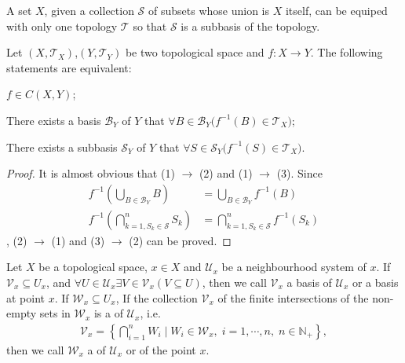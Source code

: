 \documentclass[openany]{book}
\begin{document}
A set $X$, given a collection $\mathscr S$ of subsets whose union is $X$ itself, can be equiped with only one topology $\mathscr T$ so that $\mathscr S$ is a subbasis of the topology. 

\begin{theorem}\label{continuity_basis}
Let $(X,\mathscr T_X)$,$(Y,\mathscr T_Y)$ be two topological space and $f \colon X\to Y$.
The following statements are equivalent:
\begin{conditionlist}[label=(\arabic*)]
\item $f \in C(X, Y)$;
\item There exists a basis $\mathscr B_Y$ of $Y$ that $\forall B\in \mathscr B_Y\big(
	f^{-1}(B) \in \mathscr T_X\big)$;
\item There exists a subbasis $\mathscr S_Y$ of $Y$ that $\forall S\in \mathscr S_Y\big(
	f^{-1}(S) \in \mathscr T_X\big)$.
\end{conditionlist}
\end{theorem}
\begin{proof}
It is almost obvious that (1) $\to$ (2) and (1) $\to$ (3). Since
\begin{align*}
	f^{-1} \left(
		\bigcup_{B\in \mathscr B_Y} B\right) &= \bigcup_{B\in \mathscr B_Y}  f^{-1}(B)\\
	f^{-1}\left(
		\bigcap^n_{k=1,S_k\in \mathscr S} S_k\right) &=\bigcap^n_{k=1,S_k\in \mathscr S} f^{-1}(S_k)
\end{align*}
, (2) $\to$ (1) and (3) $\to$ (2) can be proved. 
\end{proof}

\begin{definition}\label{basis_subbasis_neighbourhood}
Let $X$ be a topological space, $x\in X$ and $\mathscr U_x$ be a neighbourhood system of $x$.
If $\mathscr V_x \subseteq U_x$, and $\forall U\in \mathscr U_x \exists V\in \mathscr V_x (V\subseteq U)$, 
then we call $\mathscr V_x$ a basis of $\mathscr U_x$ or a basis at point $x$.
If $\mathscr W_x \subseteq U_x$, If the collection $\mathscr V_x$ of the finite intersections of the non-empty sets in $\mathscr W_x$ is a  of $\mathscr U_x$, i.e.\ 
\begin{align*}
	\mathscr V_x = \left\{
		\bigcap\limits_{i=1}^n W_i \mid
			W_i \in \mathscr W_x,\;i=1,\cdots,n,\;n\in\mathbb N_+\right\},
\end{align*}
then we call $\mathscr W_x$ a  of $\mathscr U_x$ or of the point $x$.
\end{definition}
\end{document}
